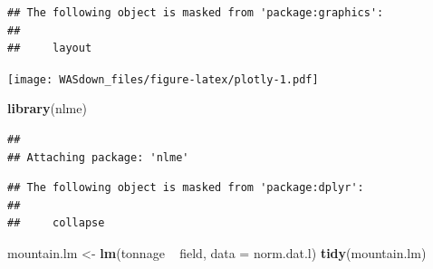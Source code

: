\documentclass[]{book}
\newenvironment{Shaded}{\begin{snugshade}}{\end{snugshade}}
\newcommand{\KeywordTok}[1]{\textcolor[rgb]{0.13,0.29,0.53}{\textbf{{#1}}}}
\newcommand{\DataTypeTok}[1]{\textcolor[rgb]{0.13,0.29,0.53}{{#1}}}
\newcommand{\StringTok}[1]{\textcolor[rgb]{0.31,0.60,0.02}{{#1}}}
\newcommand{\CommentTok}[1]{\textcolor[rgb]{0.56,0.35,0.01}{\textit{{#1}}}}
\newcommand{\NormalTok}[1]{{#1}}
\theoremstyle{definition}
\theoremstyle{definition}
\theoremstyle{remark}
\begin{document}
\begin{verbatim}
## The following object is masked from 'package:graphics':
## 
##     layout
\end{verbatim}

\begin{Shaded}
\end{Shaded}

\texttt{[image: WASdown\_files/figure-latex/plotly-1.pdf]}

\begin{Shaded}
\begin{Highlighting}[]
\KeywordTok{library}\NormalTok{(nlme)}
\end{Highlighting}
\end{Shaded}

\begin{verbatim}
## 
## Attaching package: 'nlme'
\end{verbatim}

\begin{verbatim}
## The following object is masked from 'package:dplyr':
## 
##     collapse
\end{verbatim}

\begin{Shaded}
\begin{Highlighting}[]
\NormalTok{mountain.lm <-}\StringTok{ }\KeywordTok{lm}\NormalTok{(tonnage ~}\StringTok{ }\NormalTok{field, }\DataTypeTok{data =} \NormalTok{norm.dat.l)}
\KeywordTok{tidy}\NormalTok{(mountain.lm)}
\end{Highlighting}
\end{Shaded}
\end{document}

